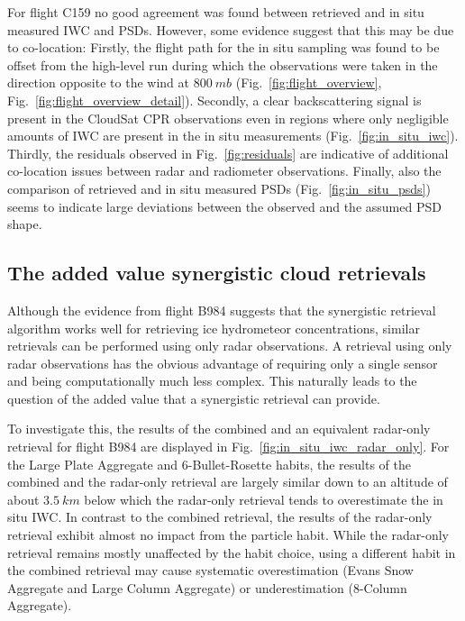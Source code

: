 \documentclass[journal abbreviation, manuscript]{copernicus}
\begin{document}
For flight C159 no good agreement was found between retrieved and in situ
measured IWC and PSDs. However, some evidence suggest that this may be due to
co-location: Firstly, the flight path for the in situ sampling was found to be
offset from the high-level run during which the observations were taken in the
direction opposite to the wind at $800\ \unit{mb}$
(Fig.~\ref{fig:flight_overview}, Fig.~\ref{fig:flight_overview_detail}).
Secondly, a clear backscattering signal is present in the CloudSat CPR
observations even in regions where only negligible amounts of IWC are present in
the in situ measurements (Fig.~\ref{fig:in_situ_iwc}). Thirdly, the residuals
observed in Fig.~\ref{fig:residuals} are indicative of additional co-location
issues between radar and radiometer observations. Finally, also the
comparison of retrieved and in situ measured PSDs (Fig.~\ref{fig:in_situ_psds})
seems to indicate large deviations between the observed and the assumed PSD
shape.

\subsection{The added value synergistic cloud retrievals}

Although the evidence from flight B984 suggests that the synergistic
retrieval algorithm works well for retrieving ice hydrometeor concentrations,
similar retrievals can be performed using only radar observations. A retrieval
using only radar observations has the obvious advantage of requiring only
a single sensor and being computationally much less complex. This naturally
leads to the question of the added value that a synergistic retrieval
can provide.

To investigate this, the results of the combined and an equivalent radar-only
retrieval for flight B984 are displayed in
Fig.~\ref{fig:in_situ_iwc_radar_only}. For the Large Plate Aggregate and
6-Bullet-Rosette habits, the results of the combined and the radar-only
retrieval are largely similar down to an altitude of about $3.5\ \unit{km}$
below which the radar-only retrieval tends to overestimate the in situ IWC. In
contrast to the combined retrieval, the results of the radar-only retrieval
exhibit almost no impact from the particle habit. While the radar-only retrieval
remains mostly unaffected by the habit choice, using a different habit in the
combined retrieval may cause systematic overestimation (Evans Snow Aggregate and
Large Column Aggregate) or underestimation (8-Column Aggregate).
\end{document}
